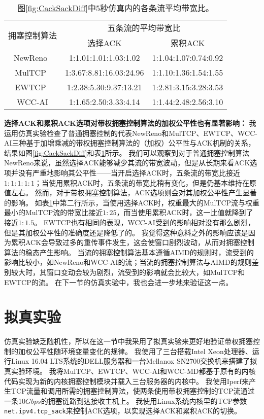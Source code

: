 \documentclass[winfonts]{njuthesis}
\begin{document}
\begin{table}[h]
	\caption{图\ref{fig:CackSackDiff}中5秒仿真内的各条流平均带宽比。}
	\label{tab:CackSackDiff}
	\centering
	\begin{tabular}{c|cc}
		\hline
		\multirow{2}{*}{拥塞控制算法} & \multicolumn{2}{c}{五条流的平均带宽比} \\
		\cline{2-3} & 选择ACK & 累积ACK \\
		\hline
		NewReno~\cite{Henderson2012NewReno} & 1:1.01:1.01:1.03:1.02 & 1:1.04:1.07:0.74:0.92 \\
		MulTCP~\cite{crowcroft1998differentiated} & 1:3.67:8.81:16.03:24.96 & 1:1.10:1.36:1.54:1.55 \\
		EWTCP~\cite{Honda2009EWTCP} & 1:2.38:5.30:9.37:13.21 & 1:2.81:3.15:3.28:3.53\\
		WCC-AI & 1:1.65:2.50:3.33:4.14 & 1:1.44:2.48:2.56:3.10\\
		\hline
	\end{tabular}
\end{table}

\textbf{选择ACK和累积ACK选项对带权拥塞控制算法的加权公平性也有显著影响：}
我运用仿真实验检查了普通拥塞控制的代表NewReno和MulTCP、EWTCP、WCC-AI三种基于加增乘减的带权拥塞控制算法的（加权）公平性与ACK机制的关系，结果如图\ref{fig:CackSackDiff}和表\ref{tab:CackSackDiff}所示。
我们可以观察到对于普通拥塞控制算法NewReno来说，虽然选择ACK能够减少其流的带宽波动，但是从长期来看ACK选项并没有严重地影响其公平性——当开启选择ACK时，五条流的带宽比接近$1:1:1:1:1$；当使用累积ACK时，五条流的带宽比稍有变化，但是仍基本维持在原值左右。
然而，对于带权拥塞控制算法，ACK选项则会对其加权公平性产生显著的影响。
如表\ref{tab:CackSackDiff}中第二行所示，当使用选择ACK时，权重最大的MulTCP流与权重最小的MulTCP流的带宽比接近$1:25$，而当使用累积ACK时，这一比值就降到了接近$1:1.5$。
EWTCP也有相同的表现，WCC-AI受到的影响相对没有那么剧烈，但是其加权公平性的准确度还是降低了的。
我觉得这种意料之外的影响应该是因为累积ACK会导致过多的重传事件发生\cite{Mathis1996SACK}，这会使窗口剧烈波动，从而对拥塞控制算法的稳态产生影响。
当流的拥塞控制算法基本遵循AIMD的规则时，流受到的影响比较小，如NewReno和WCC-AI的流；当流的拥塞控制算法与AIMD的规则差别较大时，其窗口变动会较为剧烈，流受到的影响就会比较大，如MulTCP和EWTCP的流。
在下一节的仿真实验中，我也会进一步地来验证这一点。

\section{拟真实验}
\label{sec:emulation}

仿真实验缺乏随机性，所以在这一节中我采用了拟真实验来更好地验证带权拥塞控制的加权公平性随环境变量变化的规律。
我使用了三台搭载Intel Xeon处理器、运行Linux 16.04 LTS系统的DELL服务器和一台Mellanox SN2700交换机来搭建了拟真实验环境。
我将MulTCP、EWTCP、WCC-AI和WCC-MD都基于原有的内核代码实现为新的内核拥塞控制模块并载入三台服务器的内核中。
我使用Iperf\cite{iperf}来产生TCP流量和调用所需的拥塞控制算法，使两条使用带权拥塞控制的TCP流通过一条10$Gbps$的拥塞链路到达接收主机上。
我使用Linux系统内核里的TCP参数{\tt net.ipv4.tcp\_sack}来控制ACK选项，以实现选择ACK和累积ACK的切换。
\end{document}
